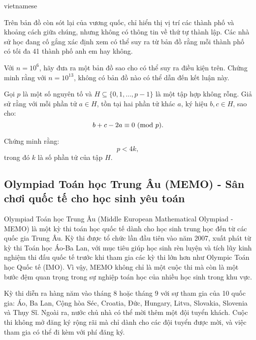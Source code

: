 \documentclass{article}
\begin{document}
\begin{otherlanguage*}{vietnamese}
\begin{problem*}[2024, bài 2]
    Trên bản đồ còn sót lại của vương quốc, chỉ hiển thị vị trí các thành phố và khoảng cách giữa chúng, nhưng không có thông tin về thứ tự thành lập.
    Các nhà sử học đang cố gắng xác định xem có thể suy ra từ bản đồ rằng mỗi thành phố có tối đa 41 thành phố anh em hay không.  

    \begin{enumerate}[topsep=0pt, partopsep=0pt, itemsep=0pt]
        \ii Với \( n = 10^6 \), hãy đưa ra một bản đồ sao cho có thể suy ra điều kiện trên.  
        \ii Chứng minh rằng với \( n = 10^{13} \), không có bản đồ nào có thể dẫn đến kết luận này.  
    \end{enumerate}
\end{problem*}

\begin{problem*}[2024, bài 3]
    Gọi \( p \) là một số nguyên tố và \( H \subseteq \{0, 1, \dots, p-1\} \) là một tập hợp không rỗng.
    Giả sử rằng với mỗi phần tử \( a \in H \), tồn tại hai phần tử khác \( a \), ký hiệu \( b, c \in H \), sao cho:
    \[
        b + c - 2a \equiv 0 \ (\mathrm{mod}\ p).
    \]
    
    Chứng minh rằng:
    \[
        p < 4k,
    \]
    trong đó \( k \) là số phần tử của tập \( H \).
\end{problem*}

\newpage

\subsection{Olympiad Toán học Trung Âu (MEMO) - Sân chơi quốc tế cho học sinh yêu toán}

Olympiad Toán học Trung Âu (Middle European Mathematical Olympiad - MEMO) là một kỳ thi toán học quốc tế dành cho học sinh trung học đến từ các quốc gia Trung Âu.
Kỳ thi được tổ chức lần đầu tiên vào năm 2007, xuất phát từ kỳ thi Toán học Áo-Ba Lan,
với mục tiêu giúp học sinh rèn luyện và tích lũy kinh nghiệm thi đấu quốc tế trước khi tham gia các kỳ thi lớn hơn như Olympic Toán học Quốc tế (IMO).
Vì vậy, MEMO không chỉ là một cuộc thi mà còn là một bước đệm quan trọng trong sự nghiệp toán học của nhiều học sinh trong khu vực.

Kỳ thi diễn ra hàng năm vào tháng 8 hoặc tháng 9 với sự tham gia của 10 quốc gia: Áo, Ba Lan, Cộng hòa Séc, Croatia, Đức, Hungary, Litva, Slovakia, Slovenia và Thụy Sĩ.
Ngoài ra, nước chủ nhà có thể mời thêm một đội tuyển khách. Cuộc thi không mở đăng ký rộng rãi mà chỉ dành cho các đội tuyển được mời, và việc tham gia có thể đi kèm với phí đăng ký.


\end{otherlanguage*}
\end{document}
